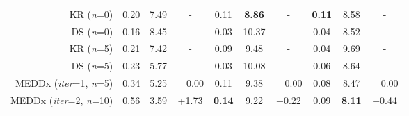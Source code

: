 \begin{table*}[ht]
\begin{tabular}{rccccccccc}
KR (\textit{n}=0)     &     0.20       &  7.49  &  -  &   0.11      &  \textbf{8.86}       & -  &     \textbf{0.11}     &  8.58  &    -   \\
DS (\textit{n}=0)  &       0.16         &       8.45     &       -      &      0.03          &      10.37        &          -      &         0.04     &       8.52      &           -      \\
KR (\textit{n}=5)  &      0.21      & 7.42   &  -  &  0.09  &  9.48       & -  &     0.04   &   9.69 &    -   \\
DS (\textit{n}=5)  &     0.23      &  5.77  &  -  &  0.03 &   10.08    & -  &   0.06    &  8.64  &    -   \\\cmidrule(lr){2-10}
MEDDx (\textit{iter}=1, \textit{n}=5)                       & 0.34           & 5.25   &   ~~0.00 & 0.11        & 9.38       &  ~~0.00  & 0.08         & 8.47    &    ~~0.00   \\
MEDDx (\textit{iter}=2, \textit{n}=10)                       & 0.56           & 3.59    & +1.73  & \textbf{0.14}        & 9.22       &  +0.22  & 0.09         & \textbf{8.11}      &  +0.44   \\

\end{tabular}
\end{table*}
